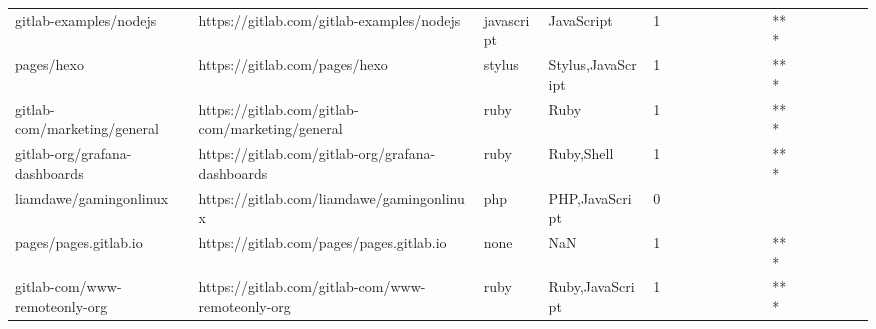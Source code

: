 \begin{tabular}{llllrlllllllllllll}
gitlab-examples/nodejs                             &          https://gitlab.com/gitlab-examples/nodejs &        javascript &                                         JavaScript &       1 &         &        &           &                &                 &        &           &       *** &          &          &       &              &          \\
pages/hexo                                         &                      https://gitlab.com/pages/hexo &            stylus &                                  Stylus,JavaScript &       1 &         &        &           &                &                 &        &           &       *** &          &          &       &              &          \\
gitlab-com/marketing/general                       &    https://gitlab.com/gitlab-com/marketing/general &              ruby &                                               Ruby &       1 &         &        &           &                &                 &        &           &       *** &          &          &       &              &          \\
gitlab-org/grafana-dashboards                      &   https://gitlab.com/gitlab-org/grafana-dashboards &              ruby &                                         Ruby,Shell &       1 &         &        &           &                &                 &        &           &       *** &          &          &       &              &          \\
liamdawe/gamingonlinux                             &          https://gitlab.com/liamdawe/gamingonlinux &               php &                                     PHP,JavaScript &       0 &         &        &           &                &                 &        &           &           &          &          &       &              &          \\
pages/pages.gitlab.io                              &           https://gitlab.com/pages/pages.gitlab.io &              none &                                                NaN &       1 &         &        &           &                &                 &        &           &       *** &          &          &       &              &          \\
gitlab-com/www-remoteonly-org                      &   https://gitlab.com/gitlab-com/www-remoteonly-org &              ruby &                                    Ruby,JavaScript &       1 &         &        &           &                &                 &        &           &       *** &          &          &       &              &          \\

\end{tabular}
